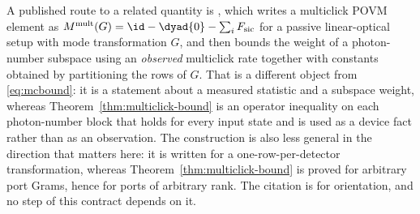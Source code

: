 
\begin{remark}\label{rem:kamin}
A published route to a related quantity is
\cite[Thm.~1, Eq.~(58)]{kamin2024improved}, which writes a multiclick POVM
element as $M^{\mathrm{mult}}(G)=\id-\dyad{0}-\sum_iF_{\mathrm{sic}}$ for a
passive linear-optical setup with mode transformation $G$, and then bounds the
weight of a photon-number subspace using an \emph{observed} multiclick rate
together with constants obtained by partitioning the rows of $G$. That is a
different object from \eqref{eq:mcbound}: it is a statement about a measured
statistic and a subspace weight, whereas Theorem~\ref{thm:multiclick-bound} is an
operator inequality on each photon-number block that holds for every input
state and is used as a device fact rather than as an observation. The
construction is also less general in the direction that matters here: it is
written for a one-row-per-detector transformation, whereas
Theorem~\ref{thm:multiclick-bound} is proved for arbitrary port Grams, hence for ports
of arbitrary rank. The citation is for orientation, and no step of this
contract depends on it.
\end{remark}
